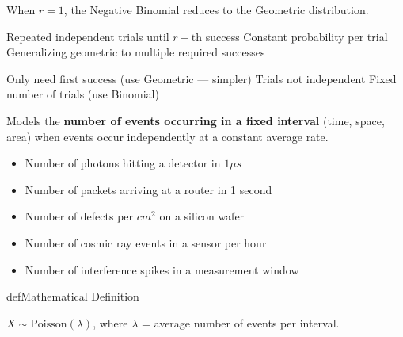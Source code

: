 




When $r = 1$, the Negative Binomial reduces to the Geometric distribution.


\PSyes{} Repeated independent trials until $r-\mathrm{th}$ success\PSbr{}\PSyes{} Constant probability per trial\PSbr{}\PSyes{} Generalizing geometric to multiple required successes


\PSno{} Only need first success (use Geometric — simpler)\PSbr{}\PSno{} Trials not independent\PSbr{}\PSno{} Fixed number of trials (use Binomial)



Models the \textbf{number of events occurring in a fixed interval} (time, space, area) when events occur independently at a constant average rate.


\begin{itemize}
\tightlist
\item
  Number of photons hitting a detector in $1 \mu s$
\item
  Number of packets arriving at a router in 1 second
\item
  Number of defects per $cm^{2}$ on a silicon wafer
\item
  Number of cosmic ray events in a sensor per hour
\item
  Number of interference spikes in a measurement window
\end{itemize}

\begin{PSbox}[unbreakable]{def}{Mathematical Definition}

$X \sim \mathrm{Poisson}(\lambda)$, where $\lambda$ = average number of events per interval.

\end{PSbox}



